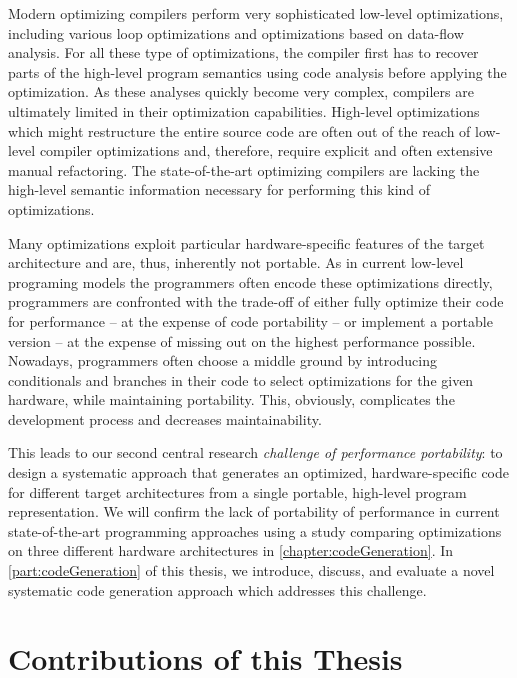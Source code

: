 Modern optimizing compilers perform very sophisticated low-level optimizations, including various loop optimizations and optimizations based on data-flow analysis.
For all these type of optimizations, the compiler first has to recover parts of the high-level program semantics using code analysis before applying the optimization.
As these analyses quickly become very complex, compilers are ultimately limited in their optimization capabilities.
High-level optimizations which might restructure the entire source code are often out of the reach of low-level compiler optimizations and, therefore, require explicit and often extensive manual refactoring.
The state-of-the-art optimizing compilers are lacking the high-level semantic information necessary for performing this kind of optimizations.

Many optimizations exploit particular hardware-specific features of the target architecture and are, thus, inherently not portable.
As in current low-level programing models the programmers often encode these optimizations directly, programmers are confronted with the trade-off of either fully optimize their code for performance -- at the expense of code portability -- or implement a portable version -- at the expense of missing out on the highest performance possible.
Nowadays, programmers often choose a middle ground by introducing conditionals and branches in their code to select optimizations for the given hardware, while maintaining portability.
This, obviously, complicates the development process and decreases maintainability.

This leads to our second central research \emph{challenge of performance portability}:
to design a systematic approach that generates an optimized, hardware-specific code for different target architectures from a single portable, high-level program representation.
We will confirm the lack of portability of performance in current state-of-the-art programming approaches using a study comparing optimizations on three different hardware architectures in \autoref{chapter:codeGeneration}.
In \autoref{part:codeGeneration} of this thesis, we introduce, discuss, and evaluate a novel systematic code generation approach which addresses this challenge.


\section{Contributions of this Thesis}

